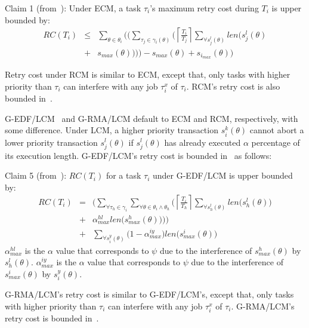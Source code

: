 \documentclass[twocolumn]{article}
\begin{document}
Claim 1 (from~\cite{stmconcurrencycontrol:emsoft11}): Under ECM, a task $\tau_i$'s maximum retry cost during $T_i$ is upper bounded by:
\begin{eqnarray}
RC\left(T_{i}\right) & \le & \sum_{\theta\in\theta_{i}}\Bigg(\Big(\sum_{\tau_{j}\in\gamma_i(\theta)}\Big(\left\lceil\frac{T_{i}}{T_{j}}\right\rceil\sum_{\forall s_{j}^{l}(\theta)}len\big(s_{j}^{l}(\theta)\nonumber \\
 & + & s_{max}(\theta)\big)\Big)\Big)-s_{max}(\theta)+s_{i_{max}}(\theta)\Bigg)\label{eq3}\end{eqnarray}


Retry cost under RCM is similar to ECM, except that, only tasks with higher priority than $\tau_i$ can interfere with any job $\tau_i^x$ of $\tau_i$. RCM's retry cost is also bounded in~\cite{stmconcurrencycontrol:emsoft11}. 

G-EDF/LCM~\cite{lcmdac2012} and G-RMA/LCM default to ECM and RCM, respectively, with some difference. Under LCM, a higher priority transaction $s_i^k(\theta)$ cannot abort a lower priority transaction $s_j^l(\theta)$ if $s_j^l(\theta)$ has already executed $\alpha$ percentage of its execution length. G-EDF/LCM's retry cost is bounded in~\cite{lcmdac2012} as follows:

Claim 5 (from~\cite{lcmdac2012}): $RC(T_i)$ for a task $\tau_i$ under G-EDF/LCM is upper bounded by:
\begin{eqnarray}
RC(T_i) & = & \Bigg(\sum_{\forall \tau_h \in \gamma_i}\sum_{\forall\theta \in \theta_i \wedge \theta_h}\Bigg(\left\lceil\frac{T_{i}}{T_{h}}\right\rceil\sum_{\forall s_{h}^{l}(\theta)}len\Big(s_{h}^{l}(\theta)\Big)\nonumber\\
& + & \alpha_{max}^{hl}len\Big(s_{max}^{h}(\theta)\Big)\Bigg)\Bigg)\nonumber\\
& + & \sum_{\forall s_{i}^{y}(\theta)}\Big(1-\alpha_{max}^{iy}\Big)len\Big(s_{max}^i(\theta)\Big)  
\label{eq78}\end{eqnarray} 
$\alpha_{max}^{hl}$ is the $\alpha$ value that corresponds to $\psi$ due to the interference of $s_{max}^h(\theta)$ by $s_h^l(\theta)$. $\alpha_{max}^{iy}$ is the $\alpha$ value that corresponds to $\psi$ due to the interference of $s_{max}^i(\theta)$ by $s_i^y(\theta)$.

G-RMA/LCM's retry cost is similar to G-EDF/LCM's, except that, only tasks with higher priority than $\tau_i$ can interfere with any job $\tau_i^x$ of $\tau_i$. G-RMA/LCM's retry cost is bounded 
in~\cite{lcmdac2012}.
\end{document}
